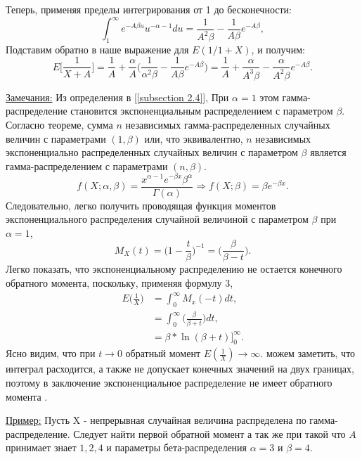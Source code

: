\documentclass[13pt]{article}
\begin{document}
Теперь, применяя пределы интегрирования от 1 до бесконечности:
\[
\int_{1}^{\infty} e^{-A\beta u}u^{-\alpha - 1}du = \frac{1}{A^{2}\beta} - \frac{1}{A\beta}e^{-A\beta},
\]
Подставим обратно в наше выражение для $E(1/1+X)$, и получим:
\begin{equation}\label{eq:32}
  E\bigg[\frac{1}{X+A}\bigg] = \frac{1}{A} + \frac{\alpha}{A}\bigg(\frac{1}{\alpha^{2}\beta} - \frac{1}{A\beta}e^{-A\beta} \bigg) = \frac{1}{A} + \frac{\alpha}{A^{3}\beta} - \frac{\alpha}{A^{2}\beta}e^{-A\beta}. 
\end{equation}

\underline{Замечания:}
Из определения в [\ref{subsection 2.4}], При $\alpha =1 $ этом гамма-распределение становится экспоненциальным распределением с параметром $\beta$. Согласно теореме, сумма $n$ независимых гамма-распределенных случайных величин с параметрами $(1,\beta)$ или, что эквивалентно, 
$n$ независимых экспоненциально распределенных случайных величин с параметром 
$\beta$ является гамма-распределением с параметрами $(n,\beta)$.
\[
f(X;\alpha,\beta) = \frac{x^{\alpha -1}e^{-\beta x} \beta^{\alpha}}{\Gamma(\alpha)} \Longrightarrow f(X;\beta) = \beta e^{-\beta x}.
\]
Следовательно, легко получить проводящая функция моментов экспоненциального распределения случайной величиной с параметром $\beta$ при $\alpha=1$,
\begin{equation}
    M_{X}(t) = \Big(1 - \frac{t}{\beta}\Big)^{-1} = \Big(\frac{\beta}{\beta - 
 t}\Big).
\end{equation}
Легко показать, что экспоненциальному распределению не остается конечного обратного момента, поскольку, применяя формулу $3$, 
\begin{align*}
    E\bigg(\frac{1}{X}\bigg) &= \int_{0}^{\infty} M_{x}(-t)dt ,\\
    &= \int_{0}^{\infty} \Big(\frac{\beta}{\beta + 
 t}\Big) dt, \\
 &= \beta * \ln(\beta + t)\Bigg]_{0}^{\infty}.
\end{align*}
Ясно видим, что при $t \to 0$ обратный момент $E(\frac{1}{X}) \to \infty$. можем заметить, что интеграл расходится, а также не допускает конечных значений на двух границах, поэтому в заключение экспоненциальное распределение не имеет обратного момента .

\underline{Пример:}
Пусть X - непрерывная случайная величина распределена по гамма-распределение. Следует найти первой обратной  момент а так же  при такой что $A$ принимает знает $ 1, 2, 4$ и параметры бета-распределения $\alpha = 3$ и $\beta = 4$.
\end{document}
